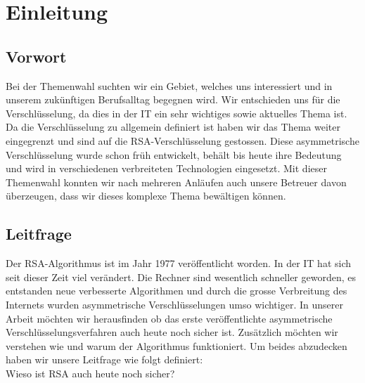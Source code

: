 \section{Einleitung}
\subsection{Vorwort}
Bei der Themenwahl suchten wir ein Gebiet, welches uns interessiert und in unserem zukünftigen Berufsalltag begegnen wird. Wir entschieden uns für die Verschlüsselung, da dies in der IT ein sehr wichtiges sowie aktuelles Thema ist. Da die Verschlüsselung zu allgemein definiert ist haben wir das Thema weiter eingegrenzt und sind auf die RSA-Verschlüsselung gestossen. Diese asymmetrische Verschlüsselung wurde schon früh entwickelt, behält bis heute ihre Bedeutung und wird in verschiedenen verbreiteten Technologien eingesetzt. Mit dieser Themenwahl konnten wir nach mehreren Anläufen auch unsere Betreuer davon überzeugen, dass wir dieses komplexe Thema bewältigen können. 
%
\subsection{Leitfrage}
Der RSA-Algorithmus ist im Jahr 1977 veröffentlicht worden. In der IT hat sich seit dieser Zeit viel verändert. Die Rechner sind wesentlich schneller geworden, es entstanden neue verbesserte Algorithmen und durch die grosse Verbreitung des Internets wurden asymmetrische Verschlüsselungen umso wichtiger. In unserer Arbeit möchten wir herausfinden ob das erste veröffentlichte asymmetrische Verschlüsselungsverfahren auch heute noch sicher ist. Zusätzlich möchten wir verstehen wie und warum der Algorithmus funktioniert. Um beides abzudecken haben wir unsere Leitfrage wie folgt definiert:\\
Wieso ist RSA auch heute noch sicher?

